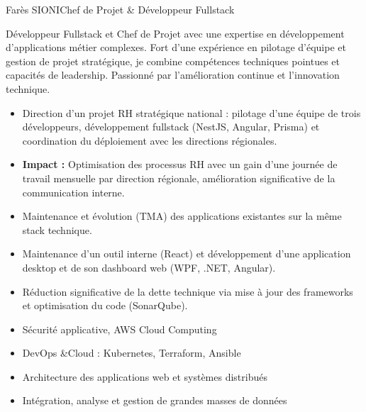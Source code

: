 \documentclass[a4paper,11pt]{article}
\begin{document}
\begin{cv}[profile][2]
{Farès SIONI}{Chef de Projet \& Développeur Fullstack}

Développeur Fullstack et Chef de Projet avec une expertise en développement d'applications métier complexes.
Fort d'une expérience en pilotage d'équipe et gestion de projet stratégique, je combine compétences techniques pointues et capacités de leadership.
Passionné par l'amélioration continue et l'innovation technique.

\begin{cvevent}[08/2023][08/2025]
    \begin{itemize}
        \item Direction d'un projet RH stratégique national : pilotage d'une équipe de trois développeurs, développement fullstack (NestJS, Angular, Prisma) et coordination du déploiement avec les directions régionales.
        \item \textbf{Impact :} Optimisation des processus RH avec un gain d'une journée de travail mensuelle par direction régionale, amélioration significative de la communication interne.
        \newline
        \item Maintenance et évolution (TMA) des applications existantes sur la même stack technique.
    \end{itemize}
\end{cvevent}

\cvseparator[2]
\begin{cvevent}[06/2023][08/2023]
    \begin{itemize}
        \item Maintenance d'un outil interne (React) et développement d'une application desktop et de son dashboard web (WPF, .NET, Angular).
        \item Réduction significative de la dette technique via mise à jour des frameworks et optimisation du code (SonarQube).
    \end{itemize}
\end{cvevent}

\begin{cvevent}[2023][2025]
    \begin{itemize}
        \item Sécurité applicative, AWS Cloud Computing
        \item DevOps \&Cloud : Kubernetes, Terraform, Ansible
        \item Architecture des applications web et systèmes distribués
        \item Intégration, analyse et gestion de grandes masses de données
    \end{itemize}
\end{cvevent}


\end{cv}
\end{document}
